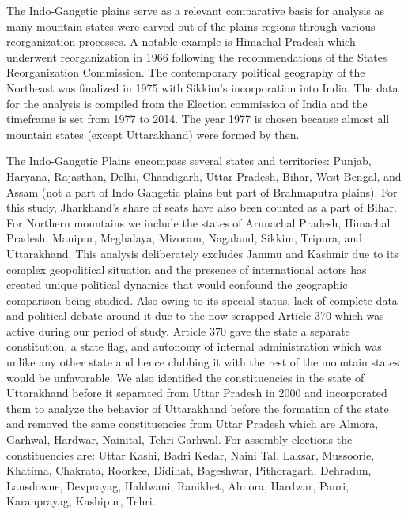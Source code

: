 The Indo-Gangetic plains serve as a relevant comparative basis for analysis as many mountain states were carved out of the plains regions through various reorganization processes. A notable example is Himachal Pradesh which underwent reorganization in 1966 following the recommendations of the States Reorganization Commission. The contemporary political geography of the Northeast was finalized in 1975 with Sikkim's incorporation into India. The data for the analysis is compiled from the Election commission of India and the timeframe is set from 1977 to 2014. The year 1977 is chosen because almost all mountain states (except Uttarakhand) were formed by then. 

\vspace{0.3cm} 

The Indo-Gangetic Plains encompass several states and territories: Punjab, Haryana, Rajasthan, Delhi, Chandigarh, Uttar Pradesh, Bihar, West Bengal, and Assam (not a part of Indo Gangetic plains but part of Brahmaputra plains). For this study,  Jharkhand's share of seats have also been counted as a part of Bihar. For Northern mountains we include the states of Arunachal Pradesh, Himachal Pradesh, Manipur, Meghalaya, Mizoram, Nagaland, Sikkim, Tripura, and Uttarakhand. This analysis deliberately excludes Jammu and Kashmir due to its complex geopolitical situation and the presence of international actors has created unique political dynamics that would confound the geographic comparison being studied. Also owing to its special status, lack of complete data and political debate around it due to the now scrapped Article 370 which was active during our period of study. Article 370 gave the state a separate constitution, a state flag, and autonomy of internal administration which was unlike any other state and hence clubbing it with the rest of the mountain states would be unfavorable. We also identified the constituencies in the state of Uttarakhand before it separated from Uttar Pradesh in 2000 and incorporated them to analyze the behavior of Uttarakhand before the formation of the state and removed the same constituencies from Uttar Pradesh which are Almora, Garhwal, Hardwar, Nainital, Tehri Garhwal. For assembly elections the constituencies are: Uttar Kashi, Badri Kedar, Naini Tal, Laksar, Mussoorie, Khatima, Chakrata, Roorkee, Didihat, Bageshwar, Pithoragarh, Dehradun, Lansdowne, Devprayag, Haldwani, Ranikhet, Almora, Hardwar, Pauri, Karanprayag, Kashipur, Tehri.

\vspace{0.3cm}


